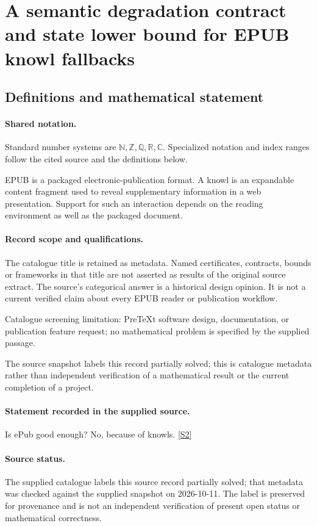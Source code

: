 \documentclass[11pt]{article}
\newcommand{\sref}[2]{\hyperlink{source:#1:#2}{[S#2]}}
\begin{document}
\section{A semantic degradation contract and state lower bound for EPUB knowl fallbacks}\label{statement}

\subsection{Definitions and mathematical statement}

\paragraph{Shared notation.}Standard number systems are $\mathbb N,\mathbb Z,\mathbb Q,\mathbb R,\mathbb C$. Specialized notation and index ranges follow the cited source and the definitions below.


EPUB is a packaged electronic-publication format. A knowl is an expandable content fragment used to reveal supplementary information in a web presentation. Support for such an interaction depends on the reading environment as well as the packaged document.
\paragraph{Record scope and qualifications.}
The catalogue title is retained as metadata. Named certificates, contracts, bounds or frameworks in that title are not asserted as results of the original source extract.
The source's categorical answer is a historical design opinion. It is not a current verified claim about every EPUB reader or publication workflow.

Catalogue screening limitation: PreTeXt software design, documentation, or publication feature request; no mathematical problem is specified by the supplied passage.

The source snapshot labels this record partially solved; this is catalogue metadata rather than independent verification of a mathematical result or the current completion of a project.
\paragraph{Statement recorded in the supplied source.}
Is ePub good enough? No, because of knowls. \sref{statement}{2}
\paragraph{Source status.}
The supplied catalogue labels this source record partially solved; that metadata was checked against the supplied snapshot on 2026-10-11. The label is preserved for provenance and is not an independent verification of present open status or mathematical correctness.
\end{document}

